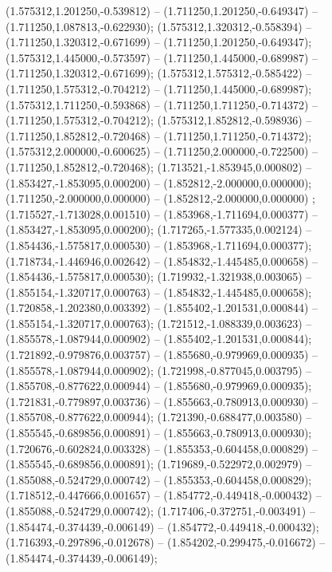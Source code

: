 (1.575312,1.201250,-0.539812) -- (1.711250,1.201250,-0.649347) -- (1.711250,1.087813,-0.622930);
 (1.575312,1.320312,-0.558394) -- (1.711250,1.320312,-0.671699) -- (1.711250,1.201250,-0.649347);
 (1.575312,1.445000,-0.573597) -- (1.711250,1.445000,-0.689987) -- (1.711250,1.320312,-0.671699);
 (1.575312,1.575312,-0.585422) -- (1.711250,1.575312,-0.704212) -- (1.711250,1.445000,-0.689987);
 (1.575312,1.711250,-0.593868) -- (1.711250,1.711250,-0.714372) -- (1.711250,1.575312,-0.704212);
 (1.575312,1.852812,-0.598936) -- (1.711250,1.852812,-0.720468) -- (1.711250,1.711250,-0.714372);
 (1.575312,2.000000,-0.600625) -- (1.711250,2.000000,-0.722500) -- (1.711250,1.852812,-0.720468);
 (1.713521,-1.853945,0.000802) -- (1.853427,-1.853095,0.000200) -- (1.852812,-2.000000,0.000000);
 (1.711250,-2.000000,0.000000) -- (1.852812,-2.000000,0.000000) ;
 (1.715527,-1.713028,0.001510) -- (1.853968,-1.711694,0.000377) -- (1.853427,-1.853095,0.000200);
 (1.717265,-1.577335,0.002124) -- (1.854436,-1.575817,0.000530) -- (1.853968,-1.711694,0.000377);
 (1.718734,-1.446946,0.002642) -- (1.854832,-1.445485,0.000658) -- (1.854436,-1.575817,0.000530);
 (1.719932,-1.321938,0.003065) -- (1.855154,-1.320717,0.000763) -- (1.854832,-1.445485,0.000658);
 (1.720858,-1.202380,0.003392) -- (1.855402,-1.201531,0.000844) -- (1.855154,-1.320717,0.000763);
 (1.721512,-1.088339,0.003623) -- (1.855578,-1.087944,0.000902) -- (1.855402,-1.201531,0.000844);
 (1.721892,-0.979876,0.003757) -- (1.855680,-0.979969,0.000935) -- (1.855578,-1.087944,0.000902);
 (1.721998,-0.877045,0.003795) -- (1.855708,-0.877622,0.000944) -- (1.855680,-0.979969,0.000935);
 (1.721831,-0.779897,0.003736) -- (1.855663,-0.780913,0.000930) -- (1.855708,-0.877622,0.000944);
 (1.721390,-0.688477,0.003580) -- (1.855545,-0.689856,0.000891) -- (1.855663,-0.780913,0.000930);
 (1.720676,-0.602824,0.003328) -- (1.855353,-0.604458,0.000829) -- (1.855545,-0.689856,0.000891);
 (1.719689,-0.522972,0.002979) -- (1.855088,-0.524729,0.000742) -- (1.855353,-0.604458,0.000829);
 (1.718512,-0.447666,0.001657) -- (1.854772,-0.449418,-0.000432) -- (1.855088,-0.524729,0.000742);
 (1.717406,-0.372751,-0.003491) -- (1.854474,-0.374439,-0.006149) -- (1.854772,-0.449418,-0.000432);
 (1.716393,-0.297896,-0.012678) -- (1.854202,-0.299475,-0.016672) -- (1.854474,-0.374439,-0.006149);
